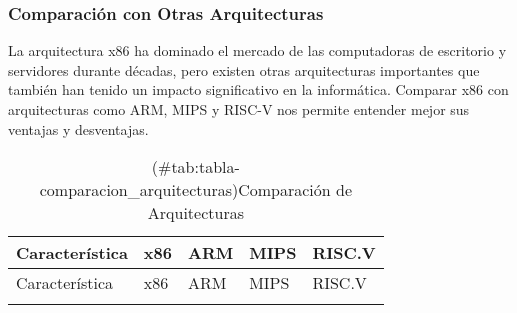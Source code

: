 \documentclass[12pt,twoside]{templates/unerthesis}
\begin{document}
\hypertarget{comparaciuxf3n-con-otras-arquitecturas}{%
\subsubsection{Comparación con Otras Arquitecturas}\label{comparaciuxf3n-con-otras-arquitecturas}}

La arquitectura x86 ha dominado el mercado de las computadoras de escritorio y servidores durante décadas, pero existen otras arquitecturas importantes que también han tenido un impacto significativo en la informática. Comparar x86 con arquitecturas como ARM, MIPS y RISC-V nos permite entender mejor sus ventajas y desventajas.

\begin{longtable}[]{@{}lllll@{}}
\caption{(\#tab:tabla-comparacion\_arquitecturas)Comparación de Arquitecturas}\tabularnewline
\toprule
\begin{minipage}[b]{0.17\columnwidth}\raggedright
Característica\strut
\end{minipage} & \begin{minipage}[b]{0.18\columnwidth}\raggedright
x86\strut
\end{minipage} & \begin{minipage}[b]{0.16\columnwidth}\raggedright
ARM\strut
\end{minipage} & \begin{minipage}[b]{0.15\columnwidth}\raggedright
MIPS\strut
\end{minipage} & \begin{minipage}[b]{0.20\columnwidth}\raggedright
RISC.V\strut
\end{minipage}\tabularnewline
\midrule
\endfirsthead
\toprule
\begin{minipage}[b]{0.17\columnwidth}\raggedright
Característica\strut
\end{minipage} & \begin{minipage}[b]{0.18\columnwidth}\raggedright
x86\strut
\end{minipage} & \begin{minipage}[b]{0.16\columnwidth}\raggedright
ARM\strut
\end{minipage} & \begin{minipage}[b]{0.15\columnwidth}\raggedright
MIPS\strut
\end{minipage} & \begin{minipage}[b]{0.20\columnwidth}\raggedright
RISC.V\strut
\end{minipage}\tabularnewline
\midrule
\endhead
\begin{minipage}[t]{0.17\columnwidth}\raggedright

\end{minipage}
\end{longtable}
\end{document}
